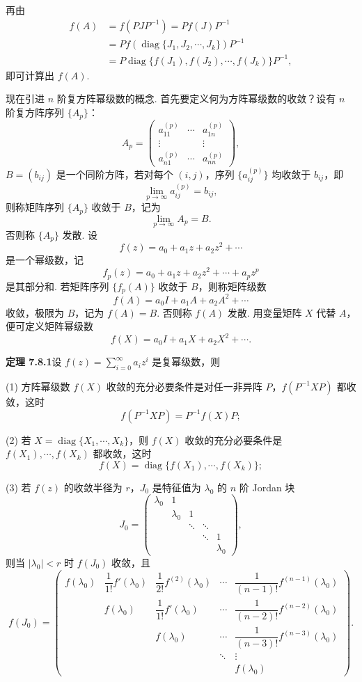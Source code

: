 \documentclass[UTF8,12pt,a4paper,fontset=fandol]{ctexart}
\begin{document}
再由
\[
\begin{aligned}
f(A)&=f(PJP^{-1})=Pf(J)P^{-1}\\
&=Pf(\operatorname{diag}\{J_1,J_2,\cdots,J_k\})P^{-1}\\
&=P\operatorname{diag}\{f(J_1),f(J_2),\cdots,f(J_k)\}P^{-1},
\end{aligned}
\]
即可计算出 $f(A)$.

现在引进 $n$ 阶复方阵幂级数的概念. 首先要定义何为方阵幂级数的收敛？设有 $n$ 阶复方阵序列 $\{A_p\}$：
\[
A_p=\left(\begin{array}{ccc}
a_{11}^{(p)} & \cdots & a_{1n}^{(p)}\\
\vdots & & \vdots\\
a_{n1}^{(p)} & \cdots & a_{nn}^{(p)}
\end{array}\right),
\]
$B=(b_{ij})$ 是一个同阶方阵，若对每个 $(i,j)$，序列 $\{a_{ij}^{(p)}\}$ 均收敛于 $b_{ij}$，即
\[
\lim_{p\to\infty}a_{ij}^{(p)}=b_{ij},
\]
则称矩阵序列 $\{A_p\}$ 收敛于 $B$，记为
\[
\lim_{p\to\infty}A_p=B.
\]
否则称 $\{A_p\}$ 发散. 设
\[
f(z)=a_0+a_1z+a_2z^2+\cdots
\]
是一个幂级数，记
\[
f_p(z)=a_0+a_1z+a_2z^2+\cdots+a_pz^p
\]
是其部分和. 若矩阵序列 $\{f_p(A)\}$ 收敛于 $B$，则称矩阵级数
\begin{equation}
f(A)=a_0I+a_1A+a_2A^2+\cdots
\tag{7.8.3}
\end{equation}
收敛，极限为 $B$，记为 $f(A)=B$. 否则称 $f(A)$ 发散. 用变量矩阵 $X$ 代替 $A$，便可定义矩阵幂级数
\begin{equation}
f(X)=a_0I+a_1X+a_2X^2+\cdots.
\tag{7.8.4}
\end{equation}

\noindent\textbf{定理 7.8.1}\quad 设 $f(z)=\sum_{i=0}^{\infty}a_iz^i$ 是复幂级数，则

(1) 方阵幂级数 $f(X)$ 收敛的充分必要条件是对任一非异阵 $P$，$f(P^{-1}XP)$ 都收敛，这时
\[
f(P^{-1}XP)=P^{-1}f(X)P;
\]

(2) 若 $X=\operatorname{diag}\{X_1,\cdots,X_k\}$，则 $f(X)$ 收敛的充分必要条件是 $f(X_1),\cdots,f(X_k)$ 都收敛，这时
\[
f(X)=\operatorname{diag}\{f(X_1),\cdots,f(X_k)\};
\]

(3) 若 $f(z)$ 的收敛半径为 $r$，$J_0$ 是特征值为 $\lambda_0$ 的 $n$ 阶 Jordan 块
\[
J_0=\left(\begin{array}{ccccc}
\lambda_0 & 1 & & & \\
& \lambda_0 & 1 & & \\
& & \ddots & \ddots & \\
& & & \ddots & 1\\
& & & & \lambda_0
\end{array}\right),
\]
则当 $|\lambda_0|<r$ 时 $f(J_0)$ 收敛，且
\[
f(J_0)=\left(\begin{array}{ccccc}
f(\lambda_0) & \dfrac1{1!}f'(\lambda_0) & \dfrac1{2!}f^{(2)}(\lambda_0) & \cdots & \dfrac1{(n-1)!}f^{(n-1)}(\lambda_0)\\
& f(\lambda_0) & \dfrac1{1!}f'(\lambda_0) & \cdots & \dfrac1{(n-2)!}f^{(n-2)}(\lambda_0)\\
& & f(\lambda_0) & \cdots & \dfrac1{(n-3)!}f^{(n-3)}(\lambda_0)\\
& & & \ddots & \vdots\\
& & & & f(\lambda_0)
\end{array}\right).
\]
\end{document}
